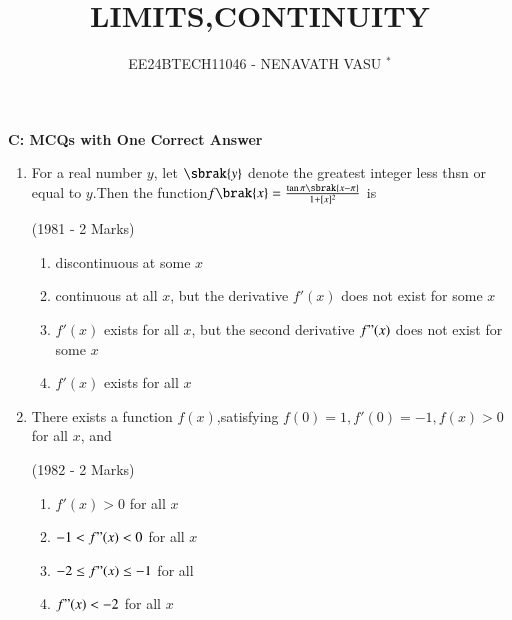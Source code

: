 \documentclass[journal,12pt,twocolumn]{IEEEtran}
\theoremstyle{remark}
\begin{document}

\vspace{3cm}

\title{LIMITS,CONTINUITY}
\author{EE24BTECH11046 - NENAVATH VASU $^{*}$%
}
\maketitle
\newpage
\bigskip

\renewcommand{\thefigure}{\theenumi}
\renewcommand{\thetable}{\theenumi}

\begin{flushleft}
\fontsize{18}{20}\selectfont
\textbf{C: MCQs with One Correct Answer}
\end{flushleft}


\begin{enumerate}[start=2]
   
\item For a real number $y$, let $\sbrak{y}$ denote the greatest integer less thsn or equal to $y$.Then the function{$f\brak{x}=\frac{\tan\pi\sbrak{x-\pi}}{1+[x]^2}$} is

\hfill                    (1981 - 2 Marks)
   \begin{enumerate}[label=(\alph*)] 
       \item discontinuous at some $x$
        \item continuous at all $x$, but the derivative $f'(x)$ does not exist for some $x$
        \item $f'(x)$ exists for all $x$, but the second derivative $f"(x)$ does not exist for some $x$
        \item $f'(x)$ exists for all $x$
   \end{enumerate}




\item There exists a function $f(x)$,satisfying $f(0)=1,f'(0)=-1,f(x)>0$ for all $x$, and 

\hfill      (1982 - 2 Marks)
    \begin{enumerate}[label=(\alph*)]

          \item $f'(x) > 0$ for all $x$
          \item$ -1 < f"(x) < 0$ for all $x$
          \item $-2 \leq f"(x) \leq -1$ for  all 
          \item $f"(x) < -2$ for all $x$

          
          

\end{enumerate}
\end{enumerate}
\end{document}
